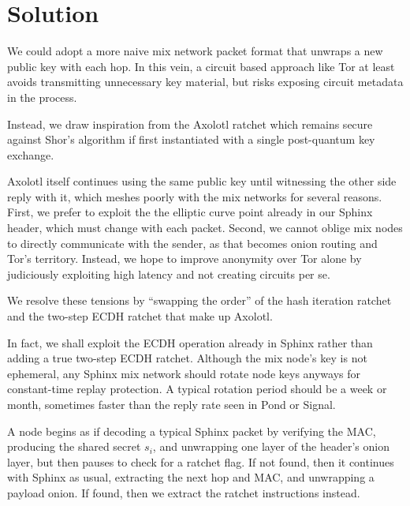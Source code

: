 \documentclass[twoside,letterpaper]{sig-alternate}
\begin{document}
\section{Solution}

We could adopt a more naive mix network packet format that unwraps
a new public key with each hop.  In this vein, a circuit based approach
like Tor at least avoids transmitting unnecessary key material, but
risks exposing circuit metadata in the process. 

Instead, we draw inspiration from the Axolotl ratchet %
which remains secure against Shor's algorithm if
 first instantiated with a single post-quantum key exchange. 

Axolotl itself continues using the same public key until witnessing
 the other side reply with it, which meshes poorly with the mix networks
for several reasons.
%
First, we prefer to exploit the the elliptic curve point
 already in our Sphinx header, which must change with each packet.
%
Second, we cannot oblige mix nodes to directly communicate with
 the sender, as that becomes onion routing and Tor's territory.
%
Instead, we hope to improve anonymity over Tor alone by
 judiciously exploiting high latency and not creating circuits per se.

We resolve these tensions by ``swapping the order'' of the hash iteration
ratchet and the two-step ECDH ratchet that make up Axolotl.  

In fact, we shall exploit the ECDH operation already in Sphinx rather
 than adding a true two-step ECDH ratchet.
Although the mix node's key is not ephemeral, any Sphinx mix network
should rotate node keys anyways for constant-time replay protection.
A typical rotation period should be a week or month, sometimes
 faster than the reply rate seen in Pond or Signal.

\smallskip


\def\cn{\textrm{cn}}
\def\ck{\textrm{ck}}
\def\DH{\textrm{DH}}
\def\lk{\textrm{lk}}
\def\mk{\textrm{mk}}
\def\sk{\textrm{sk}}
\def\ECDH{\textrm{ECDH}}

A node begins as if decoding a typical Sphinx packet by
 verifying the MAC,
 producing the shared secret $s_i$, and 
 unwrapping one layer of the header's onion layer,
but then pauses to check for a ratchet flag. 
If not found, then it continues with Sphinx as usual, 
 extracting the next hop and MAC, and unwrapping a payload onion.
If found, then we extract the ratchet instructions instead.
\end{document}
